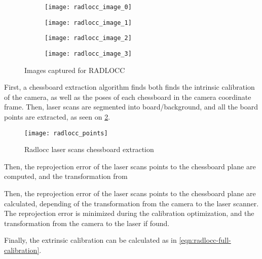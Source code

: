 \begin{figure}
    
    \centering
    \begin{subfigure}{0.5\textwidth}
        \centering
        \texttt{[image: radlocc\_image\_0]}
    \end{subfigure}%
    \begin{subfigure}{0.5\textwidth}
        \centering
        \texttt{[image: radlocc\_image\_1]}
    \end{subfigure}%

    \vspace{1cm}
    
    \begin{subfigure}{0.5\textwidth}
        \centering
        \texttt{[image: radlocc\_image\_2]}
    \end{subfigure}%
    \begin{subfigure}{0.5\textwidth}
        \centering
        \texttt{[image: radlocc\_image\_3]}
    \end{subfigure}%

    \caption{Images captured for RADLOCC}
    \label{figure:radlocc-images}
\end{figure}

First, a chessboard extraction algorithm finds both finds the intrinsic calibration of the camera, as well as the poses of each chessboard in the camera coordinate frame. Then, laser scans are segmented into board/background, and all the board points are extracted, as seen on \cref{figure:radlocc-points}.

\begin{figure}
    \centering
    \texttt{[image: radlocc\_points]}
    \caption{Radlocc laser scans chessboard extraction}
    \label{figure:radlocc-points}
\end{figure}

Then, the reprojection error of the laser scans points to the chessboard plane are computed, and the transformation from 

Then, the reprojection error of the laser scans points to the chessboard plane are calculated, depending of the transformation from the camera to the laser scanner. The reprojection error is minimized during the calibration optimization, and the transformation from the camera to the laser if found.

Finally, the extrinsic calibration can be calculated as in \cref{eqn:radlocc-full-calibration}.

